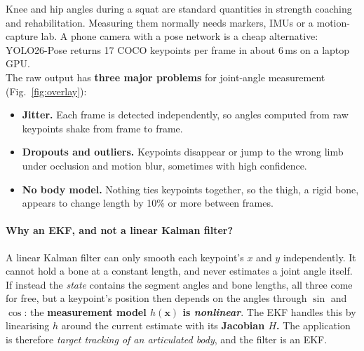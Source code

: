 \documentclass[12pt,a4paper]{article}
\begin{document}
Knee and hip angles during a squat are standard quantities in strength coaching and rehabilitation.
Measuring them normally needs markers, IMUs or a motion-capture lab. A phone camera with a pose
network is a cheap alternative: YOLO26-Pose \cite{ultralytics} returns 17 COCO keypoints
\cite{coco} per frame in about 6\,ms on a laptop GPU.\\ The raw output has \textbf{three major problems} for joint-angle
measurement (Fig.~\ref{fig:overlay}):\\
\begin{itemize}
    \item \textbf{Jitter.} Each frame is detected independently, so angles computed from raw keypoints
          shake from frame to frame.
    \item \textbf{Dropouts and outliers.} Keypoints disappear or jump to the wrong limb under occlusion and
          motion blur, sometimes with high confidence.
    \item \textbf{No body model.} Nothing ties keypoints together, so the thigh, a rigid bone, appears to
          change length by 10\% or more between frames.
\end{itemize}

\paragraph{Why an EKF, and not a linear Kalman filter?}
A linear Kalman filter \cite{kalman} can only smooth each keypoint's $x$ and $y$ independently. It
cannot hold a bone at a constant length, and never estimates a joint angle itself. If instead the \emph{state} contains the segment angles and bone
lengths, all three come for free, but a keypoint's position then depends on the angles through
$\sin$ and $\cos$: the \textbf{measurement model $h(\mathbf{x})$ is \emph{nonlinear}}. The EKF
\cite{simon,barshalom} handles this by linearising $h$ around the current estimate with its \textbf{Jacobian
$H$.} The application is therefore \emph{target tracking of an articulated body}, and the filter is
an EKF.
\end{document}
